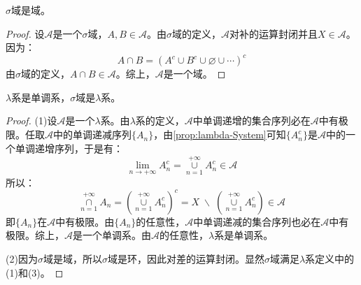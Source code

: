 \begin{theorem}\label{theo:SigmaFieldIsField}
	$\sigma$域是域。
\end{theorem}
\begin{proof}
	设$\mathscr{A}$是一个$\sigma$域，$A,B\in\mathscr{A}$。由$\sigma$域的定义，$\mathscr{A}$对补的运算封闭并且$X\in\mathscr{A}$。因为：
	\begin{equation*}
		A\cap B=(A^c\cup B^c\cup\varnothing\cup\cdots)^c
	\end{equation*}
	由$\sigma$域的定义，$A\cap B\in\mathscr{A}$。综上，$\mathscr{A}$是一个域。
\end{proof}
\begin{theorem}\label{theo:SetNecessarilySet2}
	$\lambda$系是单调系，$\sigma$域是$\lambda$系。
\end{theorem}
\begin{proof}
	(1)设$\mathscr{A}$是一个$\lambda$系。由$\lambda$系的定义，$\mathscr{A}$中单调递增的集合序列必在$\mathscr{A}$中有极限。任取$\mathscr{A}$中的单调递减序列$\{A_n\}$，由\cref{prop:lambda-System}可知$\{A_n^c\}$是$\mathscr{A}$中的一个单调递增序列，于是有：
	\begin{equation*}
		\lim_{n\to+\infty}A_n^c=\underset{n=1}{\overset{+\infty}{\cup}}A_n^c\in\mathscr{A}
	\end{equation*}
	所以：
	\begin{equation*}
		\underset{n=1}{\overset{+\infty}{\cap}}A_n=\left(\underset{n=1}{\overset{+\infty}{\cup}}A_n^c\right)^c=X\;\backslash\;\left(\underset{n=1}{\overset{+\infty}{\cup}}A_n^c\right)\in\mathscr{A}
	\end{equation*}
	即$\{A_n\}$在$\mathscr{A}$中有极限。由$\{A_n\}$的任意性，$\mathscr{A}$中单调递减的集合序列也必在$\mathscr{A}$中有极限。综上，$\mathscr{A}$是一个单调系。由$\mathscr{A}$的任意性，$\lambda$系是单调系。\par
	(2)因为$\sigma$域是域，所以$\sigma$域是环，因此对差的运算封闭。显然$\sigma$域满足$\lambda$系定义中的(1)和(3)。
\end{proof}
